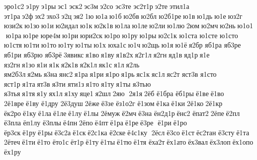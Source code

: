 эро1с2 э1ру э1ры эс1 эск2 эс3м э2со 	эс3те 
эс2т1р э2те этил1а 	эт1ра э2ф эх2 эхо3 э2ц эя2 1ю ю1а ю1б ю2бв ю2бл 
ю2б1ре ю1в ю1дь ю1е юз2г 	юзи2к ю1зо ю1и ю2идал ю1к ю2к1в ю1ла ю1ле ю2ли ю1лю 2юм ю2мч ю2нь ю1о1 ю1ра ю1ре 	юре4м ю1ри юри2ск ю1ро ю1ру ю1ры ю2с1к 	ю1ста 	ю1сте 	ю1сто 	ю1стя ю1ти ю1то ю1ту ю1ты ю1х 	юха1с ю1ч ю2щь ю1я ю1ё я2бр 	яб1ра 	яб3ре 	яб1ри 	яб3рю 	яб3рё 3явикс я1во я1ву я1в2х я2г1л я2гн яд1в яд1р я1е 	яз2гн я1зо я1и я1к я2к1в я2к1л як1с я1л я2ль 
ям2б3л я2мь я3на янс2 я1ра я1ри я1ро я1рь яс1к яс1л яс2т 	яст3в 	я1сто 	яст1р я1та ят3в я3ти 	яти1з я1то я1ту я1ты 	я3тью 	я3тья я1тя я1у ях1л я1ху яце1 я2шл 2яю  2я1я 2ёб 	ё1бра 	ёб1ры ё1ве ё1во 
2ё1вре ё1ву 	ё1дру 
2ё3душ 2ёже ё3зе 
ёз1о2г 	ё1зом ё1ка ё1ки 2ё1ко 2ё1кр 	ёк2ро ё1ку ё1ла ё1ле ё1лу ё1лы 	2ёмуж ё2мч ё3на 
ён2д1р ёнс2 	ёпат2 2ёпе ё2пл 	ё3пла 	ёп1лу 	ё3плы ё4пн 2ёпо ё4пт ё1ра ё1ре ё3ре  ё1ри ё1ро 	ёр3ск ё1ру ё1ры ё3с2а ё1ск ё2с1ка  	ё2ске ё4с1ку  2ёсл ё3со ё1ст ёс2тан 	ё3сту ё1та 	2ётеч ё1ти ё1то 	ёто1с ёт1р ё1ту ё1ты ё1тю ё1тя 	ёха2т ёх1ато ёх3вал ёх3лоп ёх1опо 	ёх1ру